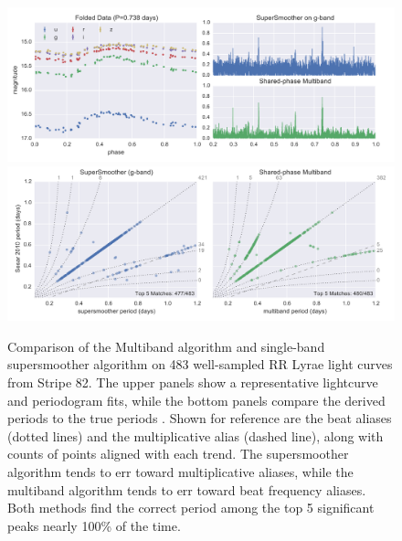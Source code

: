 \documentclass[12pt,preprint]{aastex}
\newcommand{\figlabel}[1]{\label{fig:#1}}
\begin{document}
\begin{figure}
  \centering
  \includegraphics[width=\textwidth]{fig07a.pdf}
  \includegraphics[width=\textwidth]{fig07b.pdf}
  \caption{
    Comparison of the Multiband algorithm and single-band supersmoother algorithm on 483 well-sampled RR Lyrae light curves from Stripe 82.
    The upper panels show a representative lightcurve and periodogram fits, while the bottom panels compare the derived periods to the true periods \citep[Based on a combined SuperSmoother and template-fitting approach; see][]{Sesar2010}.
    Shown for reference are the beat aliases (dotted lines) and the multiplicative alias (dashed line), along with counts of points aligned with each trend.
    The supersmoother algorithm tends to err toward multiplicative aliases, while the multiband algorithm tends to err toward beat frequency aliases.
    Both methods find the correct period among the top 5 significant peaks nearly 100\% of the time.
  } 
  \figlabel{compare_periods}
\end{figure}
\end{document}
